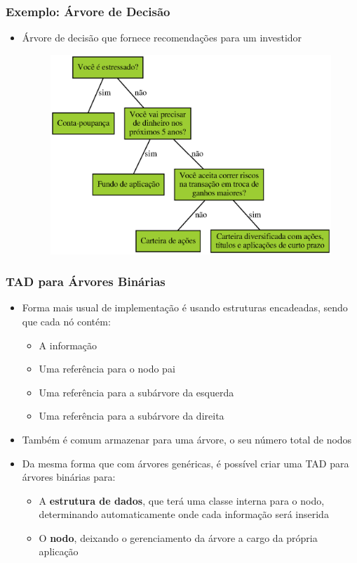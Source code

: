 \documentclass[aspectratio=169]{beamer}
\begin{document}
\begin{frame}\frametitle{Exemplo: Árvore de Decisão}
\begin{itemize}
	\item Árvore de decisão que fornece recomendações para um investidor
\begin{figure}[h]
	\centering
	\includegraphics[height=0.65\paperheight]{imagens/arvore_de_decisao3.eps}
\end{figure}
\end{itemize}
\end{frame}

\begin{frame}\frametitle{TAD para Árvores Binárias}
\begin{itemize}
	\item Forma mais usual de implementação é usando estruturas encadeadas, sendo que cada nó contém:
	\begin{itemize}
		\item A informação
		\item Uma referência para o nodo pai
		\item Uma referência para a subárvore da esquerda
		\item Uma referência para a subárvore da direita
	\end{itemize}
	\item Também é comum armazenar para uma árvore, o seu número total de nodos
	\item Da mesma forma que com árvores genéricas, é possível criar uma TAD para árvores binárias para:
	\begin{itemize}
		\item A \textbf{estrutura de dados}, que terá uma classe interna para o nodo, determinando automaticamente onde cada informação será inserida
		\item O \textbf{nodo}, deixando o gerenciamento da árvore a cargo da própria aplicação
	\end{itemize}
\end{itemize}
\end{frame}
\end{document}
